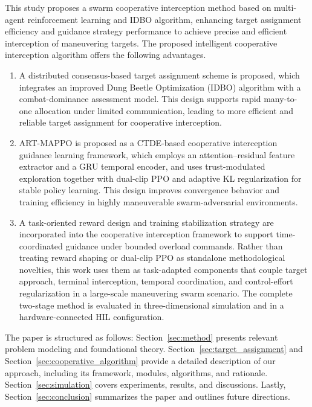 \documentclass[lettersize,journal]{IEEEtran}
\begin{document}
This study proposes a swarm cooperative interception method based on multi-agent reinforcement
learning and IDBO algorithm, enhancing target assignment efficiency and guidance strategy
performance to achieve precise and efficient interception of maneuvering targets.
The proposed intelligent cooperative interception algorithm offers the following advantages.

\begin{enumerate}
\item A distributed consensus-based target assignment scheme is proposed, which integrates an
improved Dung Beetle Optimization (IDBO) algorithm with a combat-dominance assessment model.
This design supports rapid many-to-one allocation under limited communication, leading to more
efficient and reliable target assignment for cooperative interception.

\item ART-MAPPO is proposed as a CTDE-based cooperative interception guidance learning
framework, which employs an attention--residual feature extractor and a GRU temporal encoder,
and uses trust-modulated exploration together with dual-clip PPO and adaptive KL
regularization for stable policy learning. This design improves convergence behavior and
training efficiency in highly maneuverable swarm-adversarial environments.

\item A task-oriented reward design and training stabilization strategy are incorporated into
the cooperative interception framework to support time-coordinated guidance under bounded
overload commands. Rather than treating reward shaping or dual-clip PPO as standalone
methodological novelties, this work uses them as task-adapted components that couple target
approach, terminal interception, temporal coordination, and control-effort regularization in a
large-scale maneuvering swarm scenario. The complete two-stage method is
evaluated in three-dimensional simulation and in a hardware-connected HIL
configuration.
\end{enumerate}

The paper is structured as follows: Section~\ref{sec:method} presents relevant problem modeling and foundational theory. Section~\ref{sec:target_assignment} and Section~\ref{sec:cooperative_algorithm} provide a detailed description of our approach, including its framework, modules, algorithms, and rationale. Section~\ref{sec:simulation} covers experiments, results, and discussions. Lastly, Section~\ref{sec:conclusion} summarizes the paper and outlines future directions.
\end{document}
